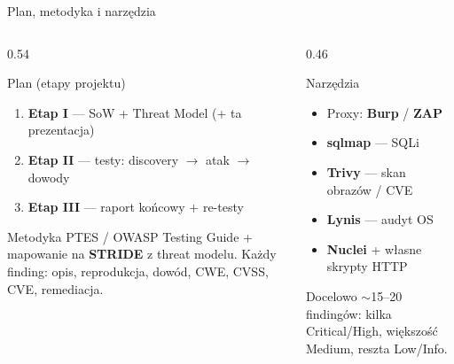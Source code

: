 \documentclass[aspectratio=169,11pt]{beamer}
\begin{document}
\begin{frame}{Plan, metodyka i narzędzia}
  \begin{columns}[T]
    \begin{column}{0.54\textwidth}
      \begin{block}{Plan (etapy projektu)}
        \footnotesize
        \begin{enumerate}
          \item \textbf{Etap I} — SoW + Threat Model (+ ta prezentacja)
          \item \textbf{Etap II} — testy: discovery $\rightarrow$ atak $\rightarrow$ dowody
          \item \textbf{Etap III} — raport końcowy + re-testy
        \end{enumerate}
      \end{block}
      \begin{block}{Metodyka}
        \footnotesize
        PTES / OWASP Testing Guide + mapowanie na \textbf{STRIDE} z threat modelu. Każdy finding: opis, reprodukcja, dowód, CWE, CVSS, CVE, remediacja.
      \end{block}
    \end{column}
    \begin{column}{0.46\textwidth}
      \begin{block}{Narzędzia}
        \footnotesize
        \begin{itemize}
          \item Proxy: \textbf{Burp} / \textbf{ZAP}
          \item \textbf{sqlmap} — SQLi
          \item \textbf{Trivy} — skan obrazów / CVE
          \item \textbf{Lynis} — audyt OS
          \item \textbf{Nuclei} + własne skrypty HTTP
        \end{itemize}
      \end{block}
      \begin{block}{Docelowo}
        \footnotesize $\sim$15–20 findingów: kilka Critical/High, większość Medium, reszta Low/Info.
      \end{block}
    \end{column}
  \end{columns}
\end{frame}
\end{document}
